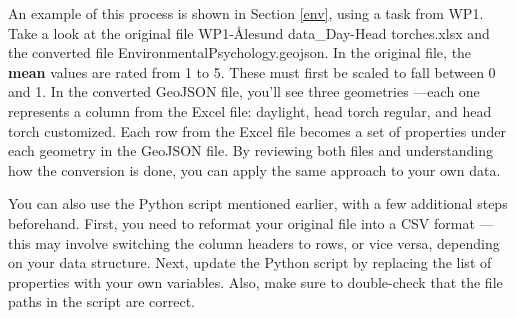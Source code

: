 An example of this process is shown in Section \ref{env}, using a task from WP1. Take a look at the original file WP1-Ålesund data\_Day-Head torches.xlsx and the converted file EnvironmentalPsychology.geojson. In the original file, the \textbf{mean} values are rated from 1 to 5. These must first be scaled to fall between 0 and 1. In the converted GeoJSON file, you’ll see three geometries —each one represents a column from the Excel file: daylight, head torch regular, and head torch customized. Each row from the Excel file becomes a set of properties under each geometry in the GeoJSON file. By reviewing both files and understanding how the conversion is done, you can apply the same approach to your own data. 

You can also use the Python script mentioned earlier, with a few additional steps beforehand. First, you need to reformat your original file into a CSV format —this may involve switching the column headers to rows, or vice versa, depending on your data structure. Next, update the Python script by replacing the list of properties with your own variables. Also, make sure to double-check that the file paths in the script are correct.





